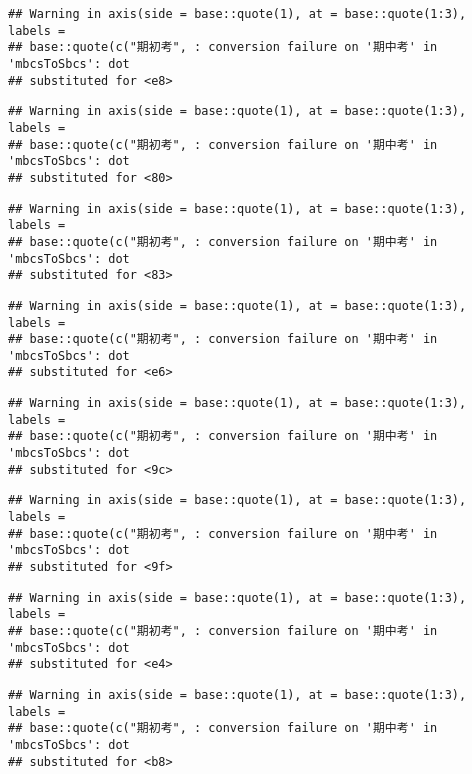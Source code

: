 \documentclass[
]{book}
\begin{document}
\begin{verbatim}
## Warning in axis(side = base::quote(1), at = base::quote(1:3), labels =
## base::quote(c("期初考", : conversion failure on '期中考' in 'mbcsToSbcs': dot
## substituted for <e8>
\end{verbatim}

\begin{verbatim}
## Warning in axis(side = base::quote(1), at = base::quote(1:3), labels =
## base::quote(c("期初考", : conversion failure on '期中考' in 'mbcsToSbcs': dot
## substituted for <80>
\end{verbatim}

\begin{verbatim}
## Warning in axis(side = base::quote(1), at = base::quote(1:3), labels =
## base::quote(c("期初考", : conversion failure on '期中考' in 'mbcsToSbcs': dot
## substituted for <83>
\end{verbatim}

\begin{verbatim}
## Warning in axis(side = base::quote(1), at = base::quote(1:3), labels =
## base::quote(c("期初考", : conversion failure on '期中考' in 'mbcsToSbcs': dot
## substituted for <e6>
\end{verbatim}

\begin{verbatim}
## Warning in axis(side = base::quote(1), at = base::quote(1:3), labels =
## base::quote(c("期初考", : conversion failure on '期中考' in 'mbcsToSbcs': dot
## substituted for <9c>
\end{verbatim}

\begin{verbatim}
## Warning in axis(side = base::quote(1), at = base::quote(1:3), labels =
## base::quote(c("期初考", : conversion failure on '期中考' in 'mbcsToSbcs': dot
## substituted for <9f>
\end{verbatim}

\begin{verbatim}
## Warning in axis(side = base::quote(1), at = base::quote(1:3), labels =
## base::quote(c("期初考", : conversion failure on '期中考' in 'mbcsToSbcs': dot
## substituted for <e4>
\end{verbatim}

\begin{verbatim}
## Warning in axis(side = base::quote(1), at = base::quote(1:3), labels =
## base::quote(c("期初考", : conversion failure on '期中考' in 'mbcsToSbcs': dot
## substituted for <b8>
\end{verbatim}
\end{document}
